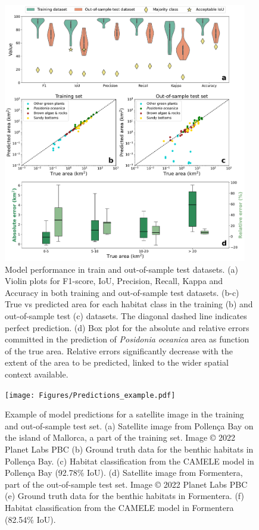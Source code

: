 \begin{figure}[H]
    \centering
    \includegraphics[width=0.95\textwidth]{Figures/Model_performance.pdf}
    \caption[Model performance in train and out-of-sample test datasets]{Model
        performance in train and out-of-sample test datasets. (a)
        Violin plots for F1-score, IoU, Precision, Recall, Kappa and Accuracy
        in both
        training and out-of-sample test datasets. (b-c) True vs predicted area
        for each
        habitat class in the training (b) and out-of-sample test (c) datasets.
        The
        diagonal dashed line indicates perfect prediction. (d) Box plot for the
        absolute
        and relative errors committed in the prediction of \textit{Posidonia
            oceanica}
        area as function of the true area. Relative errors significantly
        decrease with
        the extent of the area to be predicted, linked to the wider spatial
        context
        available.}
    \label{fig:model_performance}
\end{figure}

\begin{figure}[H]
    \centering
    \texttt{[image: Figures/Predictions\_example.pdf]}
    \caption[Example of model predictions for a satellite image in the training
        and out-of-sample test set]{Example of model predictions for a
        satellite
        image in the training
        and out-of-sample test set. (a) Satellite image from Pollença Bay on
        the island of Mallorca, a part of the training set. Image © 2022 Planet
        Labs PBC (b) Ground truth data for the benthic habitats in Pollença
        Bay. (c) Habitat classification from the CAMELE model in Pollença Bay
        (92.78\% IoU). (d) Satellite image from Formentera, part of the
        out-of-sample test set. Image © 2022 Planet Labs PBC (e) Ground truth
        data for the benthic habitats in Formentera. (f) Habitat classification
        from the CAMELE model in Formentera (82.54\% IoU).}
    \label{fig:example_prediction}
\end{figure}

